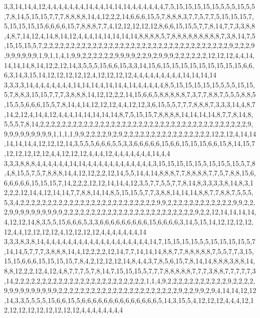 3,3,14,14,4,12,4,4,4,4,4,4,4,14,4,4,14,14,14,4,4,4,4,4,4,7,5,15,15,15,15,15,5,5,5,15,5,5,7,8,14,5,15,15,7,7,7,8,8,8,8,14,4,12,2,2,14,6,6,6,15,5,7,8,8,8,3,7,7,5,7,7,5,15,15,15,7,5,15,15,15,15,6,6,6,6,15,7,8,8,8,7,7,4,12,12,12,12,12,8,6,6,15,15,5,7,7,8,14,7,7,3,3,8,8,4,8,7,14,12,4,14,8,14,12,4,4,4,14,14,14,14,14,8,8,8,8,5,7,8,8,8,8,8,8,8,8,8,7,3,8,14,7,5,15,15,15,5,7,2,2,2,2,2,2,2,2,2,2,2,2,2,2,2,2,2,2,2,2,2,2,2,2,2,2,2,2,2,2,2,2,2,2,9,2,2,2,9,9,9,9,9,9,9,1,9,1,1,4,1,9,9,2,2,2,2,2,2,9,9,9,9,2,2,9,2,9,9,9,2,2,2,2,2,2,12,12,12,4,4,14,14,14,14,8,14,12,2,12,14,3,5,5,5,15,6,6,15,3,3,14,15,6,15,15,15,15,15,15,15,15,15,6,6,6,3,14,3,15,14,12,12,12,12,12,4,12,12,12,12,4,4,4,4,4,4,4,4,4,14,14,14,14
3,3,3,3,14,4,4,4,4,4,4,4,14,14,14,4,14,14,4,14,4,4,4,4,4,8,5,15,15,15,15,15,5,5,5,15,15,5,7,8,8,3,15,15,7,7,7,3,8,8,8,14,12,12,2,2,14,15,6,6,5,8,8,8,8,8,7,3,7,7,8,8,7,5,5,5,8,8,5,15,5,5,6,6,6,15,5,7,8,14,4,14,12,12,12,4,4,12,12,3,6,15,5,5,7,7,7,8,8,8,7,3,3,3,14,4,8,7,14,2,12,4,14,4,12,4,4,4,14,14,14,14,14,8,7,5,15,15,7,8,8,8,8,14,14,14,14,8,7,7,8,14,8,5,5,5,7,8,14,2,2,2,2,2,2,2,2,2,2,2,2,2,2,2,2,2,2,2,2,2,2,2,2,2,2,2,2,2,2,2,2,2,2,2,2,2,2,9,9,9,9,9,9,9,9,9,9,1,1,1,1,9,9,2,2,2,2,9,2,9,2,2,2,2,2,2,2,2,2,2,2,2,2,2,2,2,12,2,12,4,14,14,14,14,14,4,12,12,12,14,3,5,5,5,6,6,6,5,5,3,3,6,6,6,6,6,15,6,6,15,15,15,6,6,15,8,14,15,7,12,12,12,12,12,4,4,12,12,12,4,4,4,12,4,4,4,4,4,4,4,14,4,4
3,3,3,8,8,8,4,4,4,4,4,4,14,14,4,4,4,4,4,4,4,4,4,4,4,4,3,15,15,15,15,15,5,15,15,5,15,5,7,8,4,8,15,5,7,5,7,8,8,8,14,4,12,12,2,2,12,14,5,5,14,4,14,8,8,8,7,7,8,8,8,8,7,7,5,7,8,8,15,6,6,6,6,6,6,15,15,15,7,14,2,2,2,12,12,14,14,4,12,3,5,7,7,5,5,7,7,8,14,8,3,3,3,3,8,14,8,3,12,2,2,12,14,4,12,14,14,7,7,8,8,14,14,8,5,15,15,5,7,7,3,8,8,14,14,14,8,8,7,7,8,8,7,5,5,5,5,3,4,2,2,2,2,2,2,2,2,2,2,2,2,2,2,2,2,2,2,2,2,2,2,2,2,2,9,9,2,2,2,2,2,2,2,2,2,2,2,2,9,9,2,2,2,9,9,9,9,9,9,9,9,9,9,2,2,2,2,2,2,2,2,2,2,2,2,2,2,2,2,2,2,2,2,2,2,2,2,9,2,2,12,14,14,14,14,4,12,12,14,8,3,5,5,15,6,6,6,5,3,3,6,6,6,6,6,6,6,6,6,15,6,6,6,6,3,14,5,15,14,12,12,12,12,12,4,4,12,12,12,12,4,12,12,12,12,4,4,4,4,4,4,4,14
3,3,3,8,3,8,14,4,4,4,4,4,4,4,4,4,4,4,4,4,4,4,4,4,4,4,14,7,15,15,15,15,5,5,15,15,15,15,5,7,14,14,5,7,7,7,3,8,8,8,14,4,12,2,2,2,12,14,7,7,14,14,14,8,8,7,7,8,8,8,8,8,7,5,5,7,7,3,15,15,15,6,6,6,15,15,15,15,7,8,4,2,12,12,12,14,8,4,4,3,7,8,5,6,15,7,8,14,14,8,8,8,3,8,8,14,8,8,12,2,2,12,4,12,4,8,7,7,7,5,7,8,14,7,15,15,15,5,7,7,7,8,8,8,8,8,7,7,7,3,8,8,7,7,7,7,7,3,14,2,2,2,2,2,2,2,2,2,2,2,2,2,2,2,2,2,2,2,2,2,2,2,2,1,1,4,9,2,2,2,2,2,2,2,2,2,2,2,9,2,2,2,2,9,9,9,9,9,9,9,9,9,9,2,2,2,2,2,2,2,2,2,2,2,2,2,2,2,2,2,2,2,2,2,2,9,2,2,9,9,2,9,4,14,14,12,12,14,3,3,5,5,5,5,15,6,6,15,5,6,6,6,6,6,6,6,6,6,6,6,6,6,6,5,14,3,15,5,4,12,12,12,4,4,4,12,12,12,12,12,12,12,12,12,12,4,4,4,4,4,4,4,4

